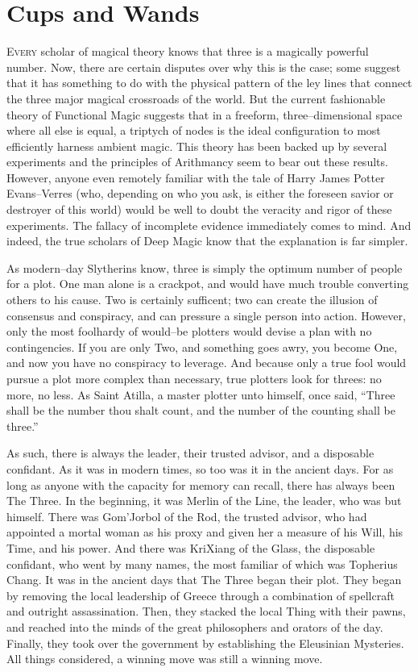 \chapter{Cups and Wands}

\lettrine{E}{very} scholar of magical theory knows that three is a magically powerful number. Now, there are certain disputes over why this is the case; some suggest that it has something to do with the physical pattern of the ley lines that connect the three major magical crossroads of the world. But the current fashionable theory of Functional Magic suggests that in a freeform, three\mbox{--}dimensional space where all else is equal, a triptych of nodes is the ideal configuration to most efficiently harness ambient magic. This theory has been backed up by several experiments and the principles of Arithmancy seem to bear out these results.
\SmallVSpace
However, anyone even remotely familiar with the tale of Harry James Potter Evans\mbox{--}Verres (who, depending on who you ask, is either the foreseen savior or destroyer of this world) would be well to doubt the veracity and rigor of these experiments. The fallacy of incomplete evidence immediately comes to mind. And indeed, the true scholars of Deep Magic know that the explanation is far simpler.
\pagebreak

As modern\mbox{--}day Slytherins know, three is simply the optimum number of people for a plot. One man alone is a crackpot, and would have much trouble converting others to his cause. Two is certainly sufficent; two can create the illusion of consensus and conspiracy, and can pressure a single person into action. However, only the most foolhardy of would\mbox{--}be plotters would devise a plan with no contingencies. If you are only Two, and something goes awry, you become One, and now you have no conspiracy to leverage. And because only a true fool would pursue a plot more complex than necessary, true plotters look for threes: no more, no less. As Saint Atilla, a master plotter unto himself, once said, “Three shall be the number thou shalt count, and the number of the counting shall be three.”

As such, there is always the leader, their trusted advisor, and a disposable confidant. As it was in modern times, so too was it in the ancient days. For as long as anyone with the capacity for memory can recall, there has always been The Three. In the beginning, it was Merlin of the Line, the leader, who was but himself. There was Gom’Jorbol of the Rod, the trusted advisor, who had appointed a mortal woman as his proxy and given her a measure of his Will, his Time, and his power. And there was KriXiang of the Glass, the disposable confidant, who went by many names, the most familiar of which was Topherius Chang.
\simpleline
It was in the ancient days that The Three began their plot. They began by removing the local leadership of Greece through a combination of spellcraft and outright assassination. Then, they stacked the local Thing with their pawns, and reached into the minds of the great philosophers and orators of the day.\\Finally, they took over the government by establishing the Eleusinian Mysteries. All things considered, a winning move was still a winning move.

